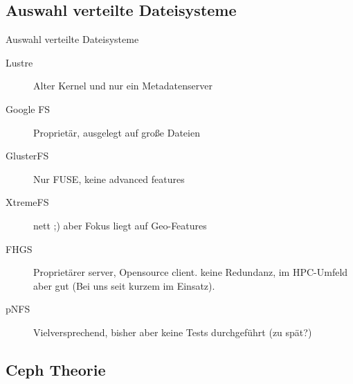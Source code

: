\documentclass[hyperref={xetex}]{beamer}
\begin{document}

\subsection{Auswahl verteilte Dateisysteme}
\begin{frame}{Auswahl verteilte Dateisysteme}
	\begin{description}	
        \item [Lustre]  Alter Kernel und nur ein Metadatenserver \\
        \item [Google FS] Propriet\"ar, ausgelegt auf große Dateien \\
        \item [GlusterFS]  Nur FUSE, keine advanced features\\
        \item [XtremeFS] nett ;) aber Fokus liegt auf Geo-Features\\
        \item [FHGS]  Propriet\"arer server, Opensource client. keine Redundanz, im HPC-Umfeld aber gut (Bei uns seit kurzem im Einsatz).
        \item [pNFS] Vielversprechend, bisher aber keine Tests durchgeführt (zu spät?)
	\end{description}
\end{frame}

\subsection{Ceph Theorie}
\end{document}
